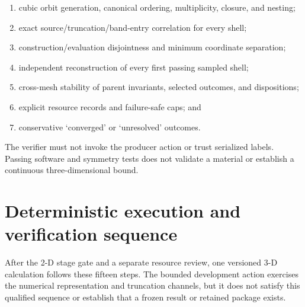 \documentclass[11pt]{article}
\begin{document}
\begin{enumerate}[label=\arabic*.]
 \item cubic orbit generation, canonical ordering, multiplicity, closure, and nesting;
 \item exact source/truncation/band-entry correlation for every shell;
 \item construction/evaluation disjointness and minimum coordinate separation;
 \item independent reconstruction of every first passing sampled shell;
 \item cross-mesh stability of parent invariants, selected outcomes, and dispositions;
 \item explicit resource records and failure-safe caps; and
 \item conservative `converged' or `unresolved' outcomes.
\end{enumerate}

The verifier must not invoke the producer action or trust serialized labels. Passing
software and symmetry tests does not validate a material or establish a continuous
three-dimensional bound.

\section{Deterministic execution and verification sequence}

After the 2-D stage gate and a separate resource review, one versioned 3-D calculation
follows these fifteen steps. The bounded development action exercises the numerical
representation and truncation channels, but it does not satisfy this qualified sequence
or establish that a frozen result or retained package exists.
\end{document}
